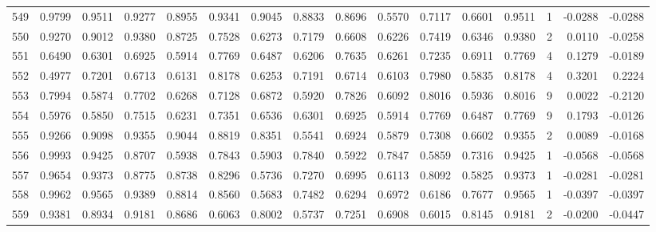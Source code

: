 \begin{tabular}{lrrrrrrrrrrrrrrr}
549 &      0.9799 &  0.9511 &  0.9277 &  0.8955 &  0.9341 &  0.9045 &  0.8833 &  0.8696 &  0.5570 &  0.7117 &   0.6601 &     0.9511 &      1 &                   -0.0288 &                    -0.0288 \\
550 &      0.9270 &  0.9012 &  0.9380 &  0.8725 &  0.7528 &  0.6273 &  0.7179 &  0.6608 &  0.6226 &  0.7419 &   0.6346 &     0.9380 &      2 &                    0.0110 &                    -0.0258 \\
551 &      0.6490 &  0.6301 &  0.6925 &  0.5914 &  0.7769 &  0.6487 &  0.6206 &  0.7635 &  0.6261 &  0.7235 &   0.6911 &     0.7769 &      4 &                    0.1279 &                    -0.0189 \\
552 &      0.4977 &  0.7201 &  0.6713 &  0.6131 &  0.8178 &  0.6253 &  0.7191 &  0.6714 &  0.6103 &  0.7980 &   0.5835 &     0.8178 &      4 &                    0.3201 &                     0.2224 \\
553 &      0.7994 &  0.5874 &  0.7702 &  0.6268 &  0.7128 &  0.6872 &  0.5920 &  0.7826 &  0.6092 &  0.8016 &   0.5936 &     0.8016 &      9 &                    0.0022 &                    -0.2120 \\
554 &      0.5976 &  0.5850 &  0.7515 &  0.6231 &  0.7351 &  0.6536 &  0.6301 &  0.6925 &  0.5914 &  0.7769 &   0.6487 &     0.7769 &      9 &                    0.1793 &                    -0.0126 \\
555 &      0.9266 &  0.9098 &  0.9355 &  0.9044 &  0.8819 &  0.8351 &  0.5541 &  0.6924 &  0.5879 &  0.7308 &   0.6602 &     0.9355 &      2 &                    0.0089 &                    -0.0168 \\
556 &      0.9993 &  0.9425 &  0.8707 &  0.5938 &  0.7843 &  0.5903 &  0.7840 &  0.5922 &  0.7847 &  0.5859 &   0.7316 &     0.9425 &      1 &                   -0.0568 &                    -0.0568 \\
557 &      0.9654 &  0.9373 &  0.8775 &  0.8738 &  0.8296 &  0.5736 &  0.7270 &  0.6995 &  0.6113 &  0.8092 &   0.5825 &     0.9373 &      1 &                   -0.0281 &                    -0.0281 \\
558 &      0.9962 &  0.9565 &  0.9389 &  0.8814 &  0.8560 &  0.5683 &  0.7482 &  0.6294 &  0.6972 &  0.6186 &   0.7677 &     0.9565 &      1 &                   -0.0397 &                    -0.0397 \\
559 &      0.9381 &  0.8934 &  0.9181 &  0.8686 &  0.6063 &  0.8002 &  0.5737 &  0.7251 &  0.6908 &  0.6015 &   0.8145 &     0.9181 &      2 &                   -0.0200 &                    -0.0447 \\

\end{tabular}
